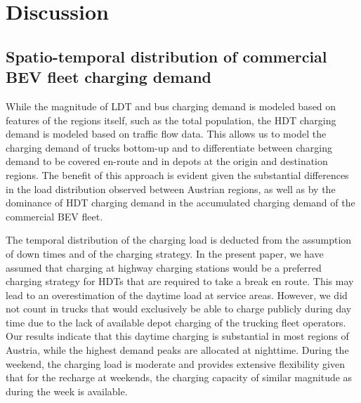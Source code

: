 \documentclass[final,10pt]{elsarticle}
\begin{document}
\section{Discussion}
        \subsection{Spatio-temporal distribution of commercial \ac{BEV} fleet charging demand}
            
            While the magnitude of \ac{LDT} and bus charging demand is modeled based on features of the regions itself, such as the total population, the \ac{HDT} charging demand is modeled based on traffic flow data. This allows us to model the charging demand of trucks bottom-up and to differentiate between charging demand to be covered en-route and in depots at the origin and destination regions. The benefit of this approach is evident given the substantial differences in the load distribution observed between Austrian regions, as well as by the dominance of \ac{HDT} charging demand in the accumulated charging demand of the commercial \ac{BEV} fleet.    

            The temporal distribution of the charging load is deducted from the assumption of down times and of the charging strategy. In the present paper, we have assumed that charging at highway charging stations would be a preferred charging strategy for \ac{HDT}s that are required to take a break en route. This may lead to an overestimation of the daytime load at service areas. However, we did not count in trucks that would exclusively be able to charge publicly during day time due to the lack of available depot charging of the trucking fleet operators. Our results indicate that this daytime charging is substantial in most regions of Austria, while the highest demand peaks are allocated at nighttime. During the weekend, the charging load is moderate and provides extensive flexibility given that for the recharge at weekends, the charging capacity of similar magnitude as during the week is available.       
    
\end{document}
